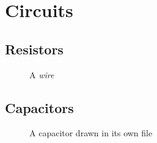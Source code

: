 \chapter{Circuits}
\section{Resistors}
\begin{figure}[h]
\centering
{}
\caption{A \emph{wire}}
\end{figure}
\section{Capacitors}
\begin{figure}[h]

\caption[Short]{A capacitor drawn in its own file}
\end{figure}
